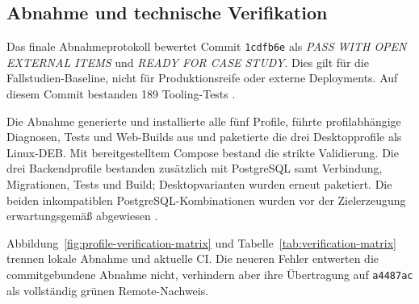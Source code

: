 \subsection{Abnahme und technische Verifikation}
\label{subsec:abnahme-technische-verifikation}

Das finale Abnahmeprotokoll bewertet Commit \texttt{1cdfb6e} als \emph{PASS
WITH OPEN EXTERNAL ITEMS} und \emph{READY FOR CASE STUDY}. Dies gilt für die
Fallstudien-Baseline, nicht für Produktionsreife oder externe Deployments. Auf
diesem Commit bestanden 189 Tooling-Tests
\parencite{kleiveist2026acceptance}.

Die Abnahme generierte und installierte alle fünf Profile, führte
profilabhängige Diagnosen, Tests und Web-Builds aus und paketierte die drei
Desktopprofile als Linux-DEB. Mit bereitgestelltem Compose bestand die strikte
Validierung. Die drei Backendprofile bestanden zusätzlich mit PostgreSQL samt
Verbindung, Migrationen, Tests und Build; Desktopvarianten wurden erneut
paketiert. Die beiden inkompatiblen PostgreSQL-Kombinationen wurden vor der
Zielerzeugung erwartungsgemäß abgewiesen
\parencite{kleiveist2026acceptance}.

Abbildung~\ref{fig:profile-verification-matrix} und
Tabelle~\ref{tab:verification-matrix} trennen lokale Abnahme und aktuelle CI.
Die neueren Fehler entwerten die commitgebundene Abnahme nicht, verhindern aber
ihre Übertragung auf \texttt{a4487ac} als vollständig grünen Remote-Nachweis.



